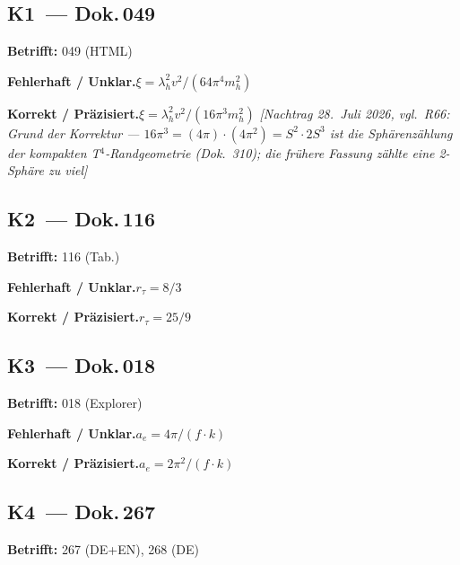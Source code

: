 \subsection*{K1~--- Dok.\,049}

\noindent\textbf{Betrifft:} 049 (HTML)


\smallskip\noindent\textbf{Fehlerhaft / Unklar.}\quad $\xi = \lambda_h^2 v^2/(64\pi^4 m_h^2)$


\smallskip\noindent\textbf{Korrekt / Präzisiert.}\quad $\xi = \lambda_h^2 v^2/(16\pi^3 m_h^2)$ \emph{[Nachtrag 28.~Juli 2026, vgl.\ R66: Grund der Korrektur --- $16\pi^3 = (4\pi)\cdot(4\pi^2) = S^2\cdot 2S^3$ ist die Sphärenzählung der kompakten T$^4$-Randgeometrie (Dok.~310); die frühere Fassung zählte eine 2-Sphäre zu viel]}


\medskip


\subsection*{K2~--- Dok.\,116}

\noindent\textbf{Betrifft:} 116 (Tab.)


\smallskip\noindent\textbf{Fehlerhaft / Unklar.}\quad $r_\tau = 8/3$


\smallskip\noindent\textbf{Korrekt / Präzisiert.}\quad $r_\tau = 25/9$


\medskip


\subsection*{K3~--- Dok.\,018}

\noindent\textbf{Betrifft:} 018 (Explorer)


\smallskip\noindent\textbf{Fehlerhaft / Unklar.}\quad $a_e = 4\pi/(f \cdot k)$


\smallskip\noindent\textbf{Korrekt / Präzisiert.}\quad $a_e = 2\pi^2/(f \cdot k)$


\medskip


\subsection*{K4~--- Dok.\,267}

\noindent\textbf{Betrifft:} 267 (DE+EN), 268 (DE)


